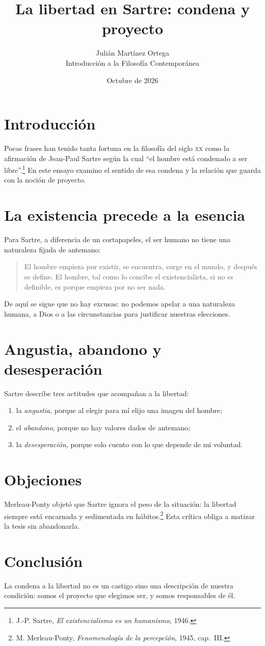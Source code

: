 \documentclass[12pt,a4paper]{article}
\title{La libertad en Sartre: condena y proyecto}
\author{Julián Martínez Ortega\\\small Introducción a la Filosofía Contemporánea}
\date{Octubre de 2026}
\begin{document}
\maketitle

\section{Introducción}
Pocas frases han tenido tanta fortuna en la filosofía del siglo \textsc{xx} como la
afirmación de Jean-Paul Sartre según la cual ``el hombre está condenado a ser
libre''.\footnote{J.-P. Sartre, \emph{El existencialismo es un humanismo}, 1946.}
En este ensayo examino el sentido de esa condena y la relación que guarda con la noción
de proyecto.

\section{La existencia precede a la esencia}
Para Sartre, a diferencia de un cortapapeles, el ser humano no tiene una naturaleza
fijada de antemano:
\begin{quote}
El hombre empieza por existir, se encuentra, surge en el mundo, y después se define. El
hombre, tal como lo concibe el existencialista, si no es definible, es porque empieza
por no ser nada.
\end{quote}
De aquí se sigue que no hay excusas: no podemos apelar a una naturaleza humana, a Dios o
a las circunstancias para justificar nuestras elecciones.

\section{Angustia, abandono y desesperación}
Sartre describe tres actitudes que acompañan a la libertad:
\begin{enumerate}
  \item la \emph{angustia}, porque al elegir para mí elijo una imagen del hombre;
  \item el \emph{abandono}, porque no hay valores dados de antemano;
  \item la \emph{desesperación}, porque solo cuento con lo que depende de mi voluntad.
\end{enumerate}

\section{Objeciones}
Merleau-Ponty objetó que Sartre ignora el peso de la situación: la libertad siempre está
encarnada y sedimentada en hábitos.\footnote{M. Merleau-Ponty, \emph{Fenomenología de la
percepción}, 1945, cap.~III.} Esta crítica obliga a matizar la tesis sin abandonarla.

\section{Conclusión}
La condena a la libertad no es un castigo sino una descripción de nuestra condición: somos
el proyecto que elegimos ser, y somos responsables de él.
\end{document}
